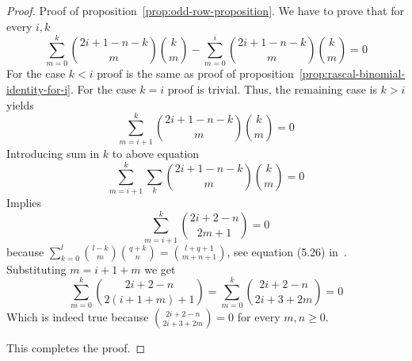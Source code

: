 \begin{proof}
    Proof of proposition~\eqref{prop:odd-row-proposition}.
    We have to prove that for every $i,k$
    \begin{equation*}
        \sum_{m=0}^{k} \binom{2i+1-n-k}{m} \binom{k}{m} - \sum_{m=0}^{i} \binom{2i+1-n-k}{m} \binom{k}{m} = 0
    \end{equation*}
    For the case $k<i$ proof is the same as proof of proposition~\eqref{prop:rascal-binomial-identity-for-i}.
    For the case $k=i$ proof is trivial.
    Thus, the remaining case is $k>i$ yields
    \begin{equation*}
        \sum_{m=i+1}^{k} \binom{2i+1-n-k}{m} \binom{k}{m} = 0
    \end{equation*}
    Introducing sum in $k$ to above equation
    \begin{equation*}
        \sum_{m=i+1}^{k} \sum_{k} \binom{2i+1-n-k}{m} \binom{k}{m} = 0
    \end{equation*}
    Implies
    \begin{equation*}
        \sum_{m=i+1}^{k} \binom{2i+2-n}{2m+1} = 0
    \end{equation*}
    because $\sum_{k=0}^{l} \binom{l-k}{m} \binom{q+k}{n} = \binom{l+q+1}{m+n+1}$, see equation (5.26) in~\cite{graham1994concrete}.
    Substituting $m=i+1+m$ we get
    \begin{equation*}
        \sum_{m=0}^{k} \binom{2i+2-n}{2(i+1+m)+1} = \sum_{m=0}^{k} \binom{2i+2-n}{2i+3+2m} = 0
    \end{equation*}
    Which is indeed true because $\binom{2i+2-n}{2i+3+2m}=0$ for every $m,n \geq 0$.

    This completes the proof.
\end{proof}

